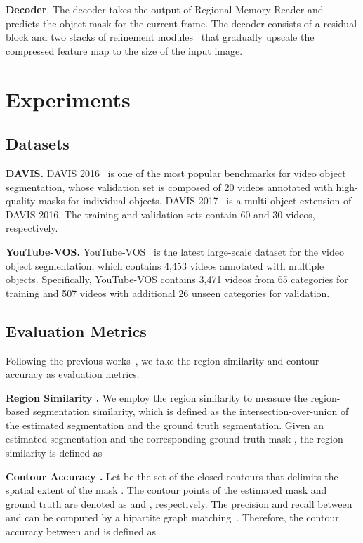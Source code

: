 \documentclass[final]{cvpr}
\begin{document}
\noindent \textbf{Decoder}.
The decoder takes the output of Regional Memory Reader and predicts the object mask for the current frame.
The decoder consists of a residual block and two stacks of refinement modules~\cite{DBLP:conf/iccv/OhLXK19} that gradually upscale the compressed feature map to the size of the input image.

\section{Experiments}

\subsection{Datasets}

\noindent \textbf{DAVIS.}
DAVIS 2016~\cite{DBLP:conf/cvpr/PerazziPMGGS16} is one of the most popular benchmarks for video object segmentation, whose validation set is composed of 20 videos annotated with high-quality masks for individual objects.
DAVIS 2017~\cite{DBLP:preprint/arxiv/1704-00675} is a multi-object extension of DAVIS 2016.
The training and validation sets contain 60 and 30 videos, respectively.

\noindent \textbf{YouTube-VOS.}
YouTube-VOS~\cite{DBLP:conf/eccv/XuYFYYLPCH18} is the latest large-scale dataset for the video object segmentation, which contains 4,453 videos annotated with multiple objects.
Specifically, YouTube-VOS contains 3,471 videos from 65 categories for training and 507 videos with additional 26 unseen categories for validation.

\subsection{Evaluation Metrics}

Following the previous works~\cite{DBLP:conf/iccv/OhLXK19,DBLP:conf/eccv/YangWY20}, we take the region similarity and contour accuracy as evaluation metrics.

\noindent \textbf{Region Similarity .}
We employ the region similarity  to measure the region-based segmentation similarity,
which is defined as the intersection-over-union of the estimated segmentation and the ground truth segmentation.
Given an estimated segmentation  and the corresponding ground truth mask , the region similarity  is defined as



\noindent \textbf{Contour Accuracy .}
Let  be the set of the closed contours that delimits the spatial extent of the mask .
The contour points of the estimated mask  and ground truth  are denoted as  and , respectively.
The precision  and recall  between  and  can be computed by a bipartite graph matching~\cite{DBLP:journals/pami/MartinFM04}.
Therefore, the contour accuracy  between  and  is defined as
\end{document}
